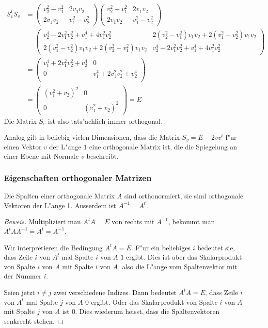 \begin{align*}
S_v^tS_v
&=
\begin{pmatrix}
v_2^2-v_1^2&2v_1v_2\\
2v_1v_2&v_1^2-v_2^2
\end{pmatrix}
\begin{pmatrix}
v_2^2-v_1^2&2v_1v_2\\
2v_1v_2&v_1^2-v_2^2
\end{pmatrix}
\\
&=
\begin{pmatrix}
v_2^4-2v_1^2v_2^2+v_1^4+4v_1^2v_2^2&
2(v_2^2-v_1^2)v_1v_2
+
2(v_1^2-v_2^2)v_1v_2
\\
2(v_1^2-v_2^2)v_1v_2
+
2(v_2^2-v_1^2)v_1v_2
&
v_2^4-2v_1^2v_2^2+v_1^4+4v_1^2v_2^2
\end{pmatrix}
\\
&=
\begin{pmatrix}
v_1^4+2v_1^2v_2^2+v_2^4&0\\
0&v_1^4+2v_1^2v_2^2+v_2^4\\
\end{pmatrix}
\\
&=
\begin{pmatrix}
(v_1^2+v_2)^2&0\\
0&(v_1^2+v_2)^2
\end{pmatrix}=E
\end{align*}
Die Matrix $S_v$ ist also tats"achlich immer orthogonal.

Analog gilt in beliebig vielen Dimensionen, dass die Matrix
$S_v=E-2v v^t$  f"ur einen Vektor $v$ der L"ange $1$ eine orthogonale
Matrix ist, die die Spiegelung an einer Ebene mit Normale $v$
beschreibt.

\subsubsection{Eigenschaften orthogonaler Matrizen}

\begin{satz}
Die Spalten einer orthogonale Matrix $A$ sind orthonormiert, sie sind
orthogonale Vektoren der L"ange 1. Ausserdem ist $A^{-1}=A^t$.
\end{satz}

\begin{proof}[Beweis]
Multipliziert man $A^tA=E$ von rechts mit $A^{-1}$, bekommt man
$A^tAA^{-1}=A^t=A^{-1}$.

Wir interpretieren die Bedingung $A^tA=E$. F"ur ein beliebiges $i$
bedeutet sie, dass Zeile $i$ von $A^t$ mal Spalte $i$ von $A$ $1$ ergibt.
Dies ist aber das Skalarprodukt von Spalte $i$ von $A$ mit Spalte $i$
von $A$, also die L"ange vom Spaltenvektor mit der Nummer $i$.

Seien jetzt $i\ne j$ zwei verschiedene Indizes. Dann bedeutet $A^tA=E$,
dass Zeile $i$ von $A^t$ mal Spalte $j$ von $A$ $0$ ergibt. Oder das
Skalarprodukt von Spalte $i$ von $A$ mit Spalte $j$ von $A$ ist $0$.
Dies wiederum heisst, dass die Spaltenvektoren senkrecht stehen.
\end{proof}

